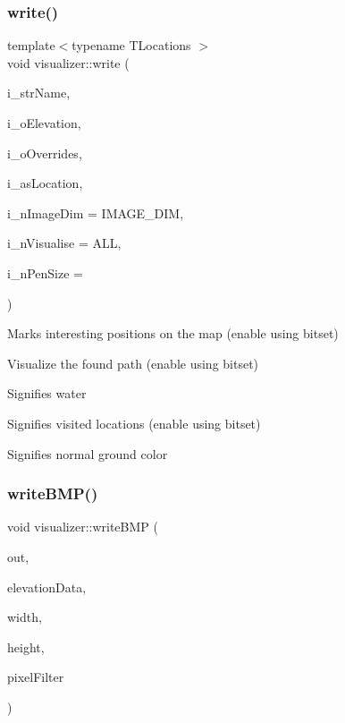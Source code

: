 \subsubsection{\texorpdfstring{write()}{write()}}
{\footnotesize\ttfamily template$<$typename T\+Locations $>$ \\
void visualizer\+::write (\begin{DoxyParamCaption}\item[{std\+::string}]{i\+\_\+str\+Name,  }\item[{uint8\+\_\+t $\ast$}]{i\+\_\+o\+Elevation,  }\item[{uint8\+\_\+t $\ast$}]{i\+\_\+o\+Overrides,  }\item[{std\+::vector$<$ T\+Locations $>$}]{i\+\_\+as\+Location,  }\item[{int}]{i\+\_\+n\+Image\+Dim = {\ttfamily IMAGE\+\_\+DIM},  }\item[{int}]{i\+\_\+n\+Visualise = {\ttfamily ALL},  }\item[{int}]{i\+\_\+n\+Pen\+Size = {} }\end{DoxyParamCaption})}

Marks interesting positions on the map (enable using bitset)

Visualize the found path (enable using bitset)

Signifies water

Signifies visited locations (enable using bitset)

Signifies normal ground color \mbox{\label{namespacevisualizer_ab4e649cd7413a51ac1ae4b31a2994c3a}} 
\subsubsection{\texorpdfstring{write\+B\+M\+P()}{writeBMP()}}
{\footnotesize\ttfamily void visualizer\+::write\+B\+MP (\begin{DoxyParamCaption}\item[{std\+::ostream \&}]{out,  }\item[{const uint8\+\_\+t $\ast$}]{elevation\+Data,  }\item[{size\+\_\+t}]{width,  }\item[{size\+\_\+t}]{height,  }\item[{std\+::function$<$ uint8\+\_\+t(size\+\_\+t, size\+\_\+t, uint8\+\_\+t)$>$}]{pixel\+Filter }\end{DoxyParamCaption})}

